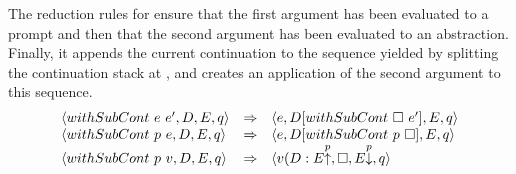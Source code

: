 The reduction rules for  ensure that the first argument has been evaluated to a prompt  and then that the second argument has been evaluated to an abstraction. Finally, it appends the current continuation to the sequence yielded by splitting the continuation stack at , and creates an application of the second argument to this sequence.
\[
  \begin{array}{lcl}
\langle withSubCont\ e\ e^\prime, D, E, q \rangle &\Rightarrow &\langle e, D[withSubCont\ \square\ e^\prime], E, q \rangle\\
\langle withSubCont\ p\ e, D, E, q \rangle &\Rightarrow &\langle e, D[withSubCont\ p\ \square], E, q \rangle \\
\langle withSubCont \ p\ v, D, E, q \rangle &\Rightarrow &\langle v (D : E\textsmaller[1]{\overset{p}{\uparrow}}, \square, E\textsmaller[1]{\overset{p}{\downarrow}}, q \rangle \\
  \end{array}
\]
\begin{comment}
eval (State (WithSubCont e e') d es q) = case e of
  Val v -> case e' of
    Val _ -> case v of (Prompt p) -> State (App e' (Seq (d:beforeP))) 
                                            Hole afterP q
                                     where beforeP = splitBefore p es
                                           afterP = splitAfter p es
    otherwise -> State e' (ret d (WithSubCont e Hole)) es q 
  otherwise -> State e (ret d (WithSubCont Hole e')) es q 
\end{comment}
\begin{Shaded}
\begin{Highlighting}[]
 \NormalTok{(} \FunctionTok{=}  
   \OtherTok{->}  
     \NormalTok{_ }\OtherTok{->}   \NormalTok{(} \OtherTok{->}  \NormalTok{(}  \FunctionTok{:}
                                             
                                      \FunctionTok{=} 
                                           \FunctionTok{=} 
    \OtherTok{->}   
  \OtherTok{->}    
\end{Highlighting}
\end{Shaded}

